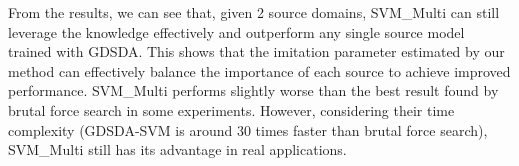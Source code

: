 From the results, we can see that, given 2 source domains, SVM\_Multi can still leverage the knowledge effectively and outperform any single source model trained with GDSDA. This shows that the imitation parameter estimated by our method can effectively balance the importance of each source to achieve improved performance. SVM\_Multi performs slightly worse than the best result found by brutal force search in some experiments. However, considering their time complexity (GDSDA-SVM is around 30 times faster than brutal force search), SVM\_Multi still has its advantage in real applications.




